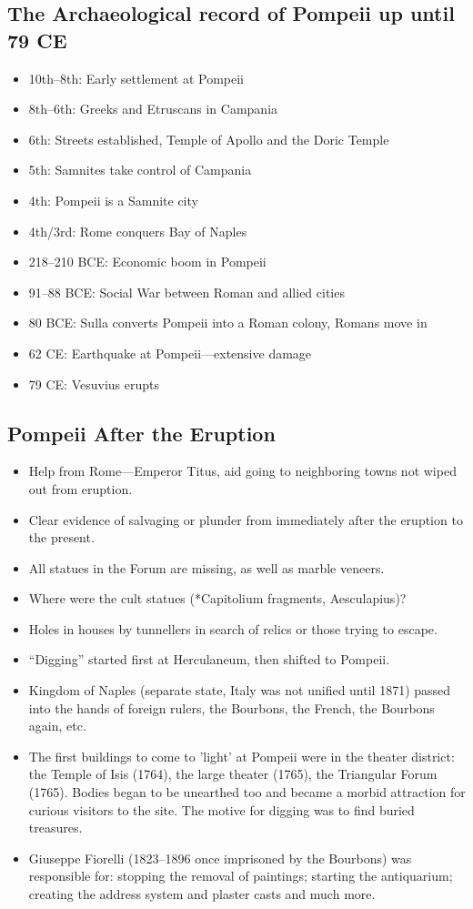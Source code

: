 \documentclass{article}
\begin{document}
\subsection{The Archaeological record of Pompeii up until 79 CE}
\begin{itemize}
\item 10th--8th: Early settlement at Pompeii
\item 8th--6th: Greeks and Etruscans in Campania
\item 6th: Streets established, Temple of Apollo and the Doric Temple
\item 5th: Samnites take control of Campania
\item 4th: Pompeii is a Samnite city
\item 4th/3rd: Rome conquers Bay of Naples
\item 218--210 BCE: Economic boom in Pompeii
\item 91--88 BCE: Social War between Roman and allied cities
\item 80 BCE: Sulla converts Pompeii into a Roman colony, Romans move in
\item 62 CE: Earthquake at Pompeii---extensive damage
\item 79 CE: Vesuvius erupts
\end{itemize}
\subsection{Pompeii After the Eruption}
\begin{itemize}
\item Help from Rome---Emperor Titus, aid going to neighboring towns not wiped out from eruption.
\item Clear evidence of salvaging or plunder from immediately after the eruption to the present.
\item All statues in the Forum are missing, as well as marble veneers.
\item Where were the cult statues (*Capitolium fragments, Aesculapius)?
\item Holes in houses by tunnellers in search of relics or those trying to escape.
\item ``Digging'' started first at Herculaneum, then shifted to Pompeii.
\item Kingdom of Naples (separate state, Italy was not unified until 1871) passed into the hands of foreign rulers, the Bourbons, the French, the Bourbons again, etc.
\item The first buildings to come to 'light' at Pompeii were in the theater district: the Temple of Isis (1764), the large theater (1765), the Triangular Forum (1765).  Bodies began to be unearthed too and became a morbid attraction for curious visitors to the site.  The motive for digging was to find buried treasures.
\item Giuseppe Fiorelli (1823--1896 once imprisoned by the Bourbons) was responsible for: stopping the removal of paintings; starting the antiquarium; creating the address system and plaster casts and much more.
\end{itemize}
\end{document}
